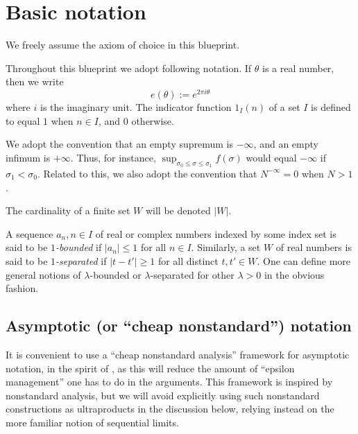 \chapter{Basic notation}

We freely assume the axiom of choice in this blueprint.

Throughout this blueprint we adopt following notation. If $\theta$ is a real number, then we write
$$ e(\theta) := e^{2\pi i\theta}$$
where $i$ is the imaginary unit. The indicator function $1_I(n)$ of a set $I$ is defined to equal $1$ when $n \in I$, and $0$ otherwise.

We adopt the convention that an empty supremum is $-\infty$, and an empty infimum is $+\infty$.  Thus, for instance, $\sup_{\sigma_0 \leq \sigma \leq \sigma_1} f(\sigma)$ would equal $-\infty$ if $\sigma_1 < \sigma_0$.  Related to this, we also adopt the convention that $N^{-\infty}=0$ when $N > 1$.

The cardinality of a finite set $W$ will be denoted $|W|$.

A sequence $a_n, n \in I$ of real or complex numbers indexed by some index set is said to be \emph{$1$-bounded} if $|a_n| \leq 1$ for all $n \in I$.  Similarly, a set $W$ of real numbers is said to be \emph{$1$-separated} if $|t-t'| \geq 1$ for all distinct $t,t' \in W$.  One can define more general notions of $\lambda$-bounded or $\lambda$-separated for other $\lambda>0$ in the obvious fashion.

\section{Asymptotic (or ``cheap nonstandard'') notation}

It is convenient to use a ``cheap nonstandard analysis'' framework for asymptotic notation, in the spirit of \cite{tao-cheap}, as this will reduce the amount of ``epsilon management'' one has to do in the arguments.  This framework is inspired by nonstandard analysis, but we will avoid explicitly using such nonstandard constructions as ultraproducts in the discussion below, relying instead on the more familiar notion of sequential limits.

